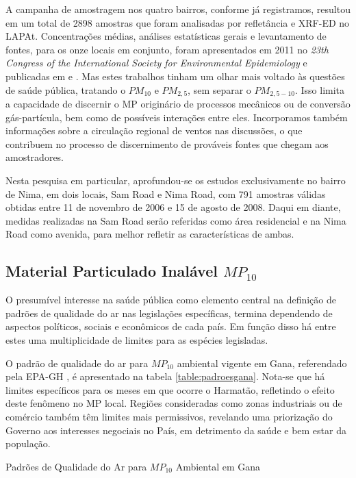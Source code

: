 A campanha de amostragem nos quatro bairros, conforme já registramos, 
resultou em um total de 2898 amostras que foram analisadas por refletância e 
XRF-ED no LAPAt. Concentrações médias, análises estatísticas gerais e 
levantamento de fontes, para os onze locais em conjunto, foram apresentados em 
2011 no \textit{23th Congress of the International Society 
for Environmental Epidemiology} \citep{zhou2011} e publicadas em \cite{zhou2013} 
e \cite{zhou2014}. Mas estes trabalhos tinham um olhar mais voltado às questões
de saúde pública, tratando o  $PM_{10}$ e $PM_{2,5}$, sem separar o 
$PM_{2,5-10}$. Isso limita a capacidade de discernir o MP originário de 
processos mecânicos ou de conversão gás-partícula, bem como de possíveis 
interações entre eles. Incorporamos também informações sobre a circulação 
regional de ventos nas discussões, o que contribuem no processo de discernimento
de prováveis fontes que chegam aos amostradores.

Nesta pesquisa em particular, aprofundou-se os estudos exclusivamente no bairro
de Nima, em dois locais, Sam Road e Nima Road, com 791 amostras válidas obtidas
entre 11 de novembro de 2006 e 15 de agosto de 2008. Daqui em diante, 
medidas realizadas na Sam Road serão referidas como área residencial e na 
Nima Road como avenida, para melhor refletir as características de ambas.

\newpage
\subsection{Material Particulado Inalável $MP_{10}$}

O presumível interesse na saúde pública como elemento central na definição 
de padrões de qualidade do ar nas legislações específicas, termina dependendo 
de aspectos políticos, sociais e econômicos de cada país. Em função disso há 
entre estes uma multiplicidade de limites para as espécies legisladas.

O padrão de qualidade do ar para $MP_{10}$ ambiental vigente em Gana, referendado
pela EPA-GH \citeyearpar{epa2015}, é apresentado na tabela 
\ref{table:padroesgana}. Nota-se que há limites específicos para os meses em que 
ocorre o Harmatão, refletindo o efeito deste fenômeno no MP local. 
Regiões consideradas como zonas industriais ou de comércio também têm limites mais
permissivos, revelando uma priorização do Governo aos interesses negociais no 
País, em detrimento da saúde e bem estar da população.

\begin{table}[H]
\centering
  
\caption{Padrões de Qualidade do Ar para $MP_{10}$ Ambiental em Gana
         \cite{epa2015} \label{table:padroesgana}}
\end{table}

